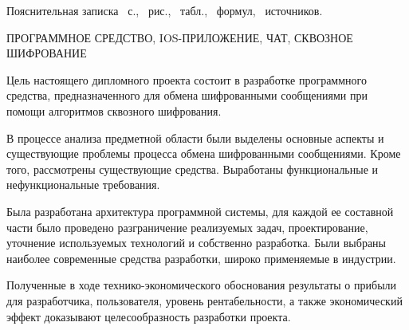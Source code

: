 \thispagestyle{empty}


\begin{center}
	Пояснительная записка \totalpages~с., \totfig{}~рис., \tottab{}~табл., \toteq{}~формул, \totref{}~источников.

	\MakeUppercase{Программное средство, iOS-приложение, чат, сквозное шифрование}
\end{center}

Цель настоящего дипломного проекта состоит в разработке программного средства, предназначенного для обмена шифрованными сообщениями при помощи алгоритмов сквозного шифрования. 

В процессе анализа предметной области были выделены основные аспекты и существующие проблемы процесса обмена шифрованными сообщениями. Кроме того, рассмотрены существующие средства. Выработаны функциональные и нефункциональные требования.

Была разработана архитектура программной системы, для каждой ее составной части было проведено разграничение реализуемых задач, проектирование, уточнение используемых технологий и собственно разработка. Были выбраны наиболее современные средства разработки, широко применяемые в индустрии. 

Полученные в ходе технико-экономического обоснования результаты о прибыли для разработчика, пользователя, уровень рентабельности, а также экономический эффект доказывают целесообразность разработки про\-екта.

